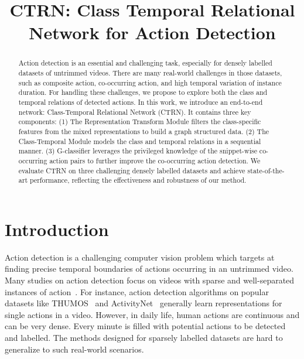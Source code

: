 \documentclass{bmvc2k}
\title{CTRN: Class Temporal Relational Network for Action Detection}
\begin{document}
\maketitle


\begin{abstract}
Action detection is an essential and challenging task, especially for densely labelled datasets of untrimmed videos. 
There are many real-world challenges in those datasets, such as composite action, co-occurring action, and high temporal variation of instance duration. 
For handling these challenges, we propose to explore both the class and temporal relations of detected actions. In this work, we introduce an end-to-end network: Class-Temporal Relational Network (CTRN). 
It contains three key components: (1) The Representation Transform Module filters the class-specific features from the mixed representations to build a graph structured data. (2) The Class-Temporal Module models the class and temporal relations in a sequential manner. (3) G-classifier leverages the privileged knowledge of the snippet-wise co-occurring action pairs to further improve the co-occurring action detection. 
We evaluate CTRN on three challenging densely labelled datasets and achieve state-of-the-art performance, reflecting the effectiveness and robustness of our method. 
\end{abstract}

\section{Introduction}
\label{sec:intro}
\indent Action detection is a challenging computer vision problem which targets at finding precise temporal boundaries of actions occurring in an untrimmed video.
Many studies on action detection focus on videos with sparse and well-separated instances of action~\cite{gtad,PGCN2019ICCV,AFNET}. For instance, action detection algorithms on popular datasets like THUMOS~\cite{THUMOS14} and ActivityNet~\cite{caba2015activitynet} generally learn representations for single actions in a video.
However, in daily life, human actions are continuous and can be very dense. Every minute is filled with potential actions to be detected and labelled. The methods designed for sparsely labelled datasets are hard to generalize to such real-world scenarios. 
\end{document}
